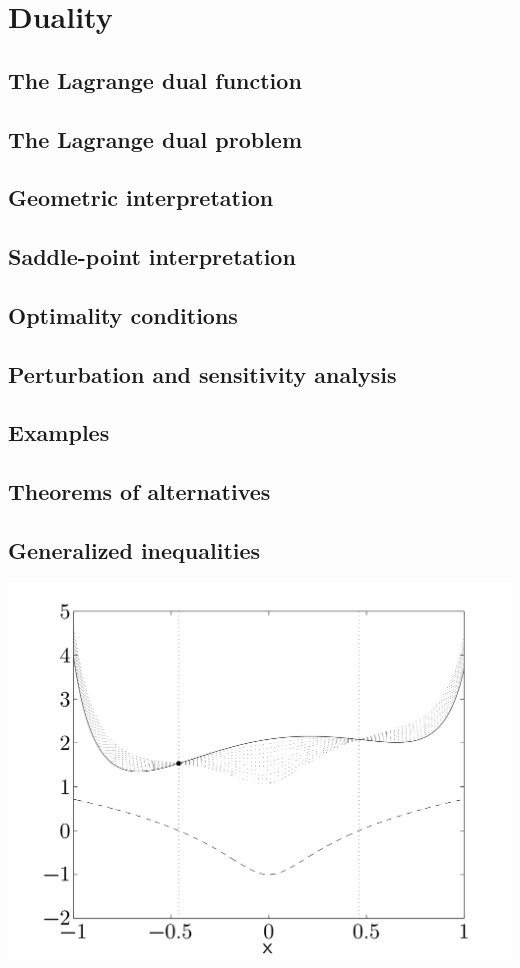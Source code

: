 \chapter{Duality}

\clearpage
\section{The Lagrange dual function}

\clearpage
\section{The Lagrange dual problem}

\clearpage
\section{Geometric interpretation}

\clearpage
\section{Saddle-point interpretation}

\clearpage
\section{Optimality conditions}

\clearpage
\section{Perturbation and sensitivity analysis}

\clearpage
\section{Examples}

\clearpage
\section{Theorems of alternatives}

\clearpage
\section{Generalized inequalities}


\clearpage
\hfil\includegraphics[width=.5\textwidth]{../Graphics/217a.png}\hfil

